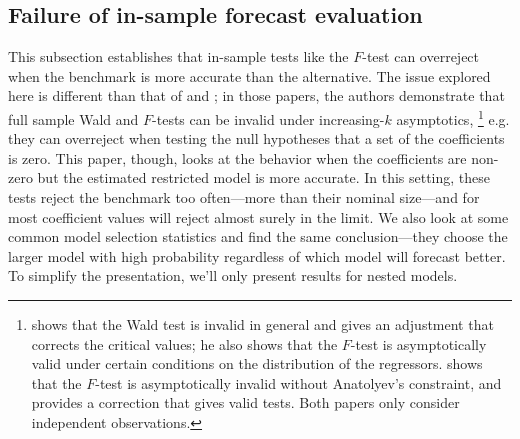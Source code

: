 \documentclass[11pt]{article}
\begin{document}
\subsection{Failure of in-sample forecast evaluation}\label{sec:insample}
This subsection establishes that in-sample tests like the $F$-test can
overreject when the benchmark is more accurate than the alternative.
The issue explored here is different than that of \citet{Cal:11c} and
\citet{Ana:12}; in those papers, the authors demonstrate that full
sample Wald and $F$-tests can be invalid under increasing-$k$
asymptotics,%
\footnote{\citet{Ana:12} shows that the Wald test is
  invalid in general and gives an adjustment that corrects the
  critical values; he also shows that the $F$-test is asymptotically
  valid under certain conditions on the distribution of the
  regressors.  \citet{Cal:11c} shows that the $F$-test is
  asymptotically invalid without Anatolyev's constraint, and provides
  a correction that gives valid tests.  Both papers only consider
  independent observations.} %
e.g. they can overreject when testing the
null hypotheses that a set of the coefficients is zero.  This paper,
though, looks at the behavior when the coefficients are non-zero but
the estimated restricted model is more accurate.  In this setting,
these tests reject the benchmark too often---more than their nominal
size---and for most coefficient values will reject almost surely in
the limit.  We also look at some common model selection statistics and
find the same conclusion---they choose the larger model with high
probability regardless of which model will forecast better.  To
simplify the presentation, we'll only present results for nested
models.
\end{document}
